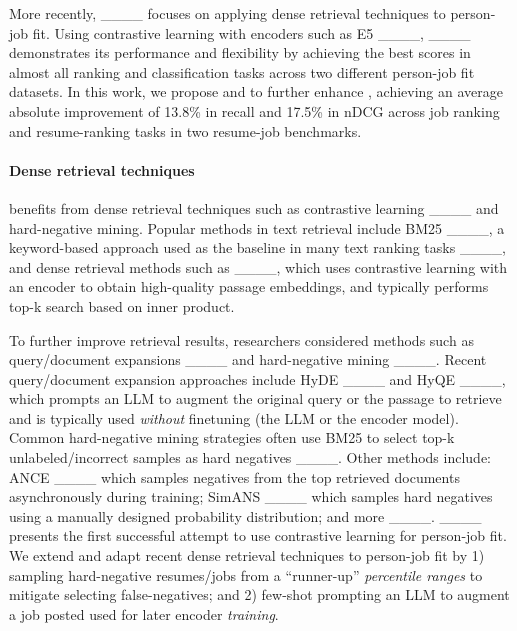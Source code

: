 More recently, \confitold{} ____ focuses on applying dense retrieval techniques to person-job fit. Using contrastive learning with encoders such as E5 ____, ____ demonstrates its performance and flexibility by achieving the best scores in almost all ranking and classification tasks across two different person-job fit datasets.
In this work, we propose \HyReShort{} and \RunnerUpMiningShort{} to further enhance \framework{}, achieving an average absolute improvement of 13.8\% in recall and 17.5\% in nDCG across job ranking and resume-ranking tasks in two resume-job benchmarks.


\paragraph{Dense retrieval techniques} 
\framework{} benefits from dense retrieval techniques such as contrastive learning ____ and hard-negative mining.
Popular methods in text retrieval include BM25 ____, a keyword-based approach used as the baseline in many text ranking tasks ____, and dense retrieval methods such as ____, which uses contrastive learning with an encoder to obtain high-quality passage embeddings, and typically performs top-k search based on inner product.

To further improve retrieval results, researchers considered methods such as query/document expansions ____ and hard-negative mining ____.
Recent query/document expansion approaches include HyDE ____ and HyQE ____, which prompts an LLM to augment the original query or the passage to retrieve and is typically used \emph{without} finetuning (the LLM or the encoder model). Common hard-negative mining strategies often use BM25 to select top-k unlabeled/incorrect samples as hard negatives ____. Other methods include: ANCE ____ which samples negatives from the top retrieved documents asynchronously during training; SimANS ____ which samples hard negatives using a manually designed probability distribution; and more ____. \confitold{} ____ presents the first successful attempt to use contrastive learning for person-job fit.
We extend \confitold{} and adapt recent dense retrieval techniques to person-job fit by 1) sampling hard-negative resumes/jobs from a ``runner-up'' \emph{percentile ranges} to mitigate selecting false-negatives; and 2) few-shot prompting an LLM to augment a job posted used for later encoder \emph{training}.


